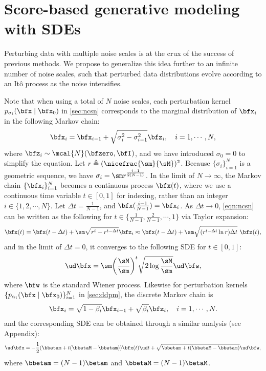 \section{Score-based generative modeling with SDEs}
Perturbing data with multiple noise scales is at the crux of the success of previous methods. We propose to generalize this idea further to an infinite number of noise scales, such that perturbed data distributions evolve according to an It\^{o} process as the noise intensifies. %

Note that when using a total of $N$ noise scales, each perturbation kernel $p_{\sigma_i}(\bfx \mid \bfx_0)$ in \cref{sec:ncsn} corresponds to the marginal distribution of $\bfx_i$ in the following Markov chain:
\begin{align}
\bfx_i = \bfx_{i-1} + \sqrt{\sigma_{i}^2 - \sigma_{i-1}^2} \bfz_i, \quad i=1,\cdots,N \label{eqn:ncsn},
\end{align}
where $\bfz_i \sim \mcal{N}(\bfzero, \bfI)$, and we have introduced $\sigma_0 = 0$ to simplify the equation. Let $r \triangleq (\nicefrac{\sm}{\sM})^2$. Because $\{\sigma_i\}_{i=1}^N$ is a geometric sequence, we have $\sigma_i = \sm r^{\frac{i-1}{2(N-1)}}$. In the limit of $N \to \infty$, the Markov chain $\{\bfx_i\}_{i=1}^N$ becomes a continuous process $\bfx(t)$, where we use a continuous time variable $t \in [0, 1]$ for indexing, rather than an integer $i \in \{1, 2, \cdots, N\}$. Let $\Delta t = \frac{1}{N-1}$, and $\bfx(\frac{i-1}{N-1}) = \bfx_i$. As $\Delta t \to 0$, \cref{eqn:ncsn} can be written as the following for $t \in \{\frac{1}{N-1}, \frac{2}{N-1}, \cdots, 1\}$ via Taylor expansion:
\begin{align*}
    \bfx(t) = \bfx(t-\Delta t) + \sm \sqrt{r^t - r^{t-\Delta t}}\bfz_i \approx \bfx(t-\Delta t) + \sm \sqrt{(r^{t-\Delta t}\ln r) \Delta t}~\bfz(t),
\end{align*}
and in the limit of $\Delta t = 0$, it converges to the following SDE for $t \in [0,1]$:
\begin{align}
\ud \bfx = \sm \bigg( \frac{\sM}{\sm} \bigg)^t \sqrt{2 \log \frac{\sM}{\sm}}\ud \bfw, \label{eqn:ncsn_sde}
\end{align}
where $\bfw$ is the standard Wiener process. Likewise for perturbation kernels $\{p_{\alpha_i}(\bfx \mid \bfx_0)\}_{i=1}^N$ in \cref{sec:ddpm}, the discrete Markov chain is
\begin{align}
    \bfx_i = \sqrt{1-\beta_{i}} \bfx_{i-1} + \sqrt{\beta_{i}} \bfz_i, \quad i=1,\cdots,N. \label{eqn:ddpm}
\end{align}
and the corresponding SDE can be obtained through a similar analysis (see Appendix):
\begin{align}
\ud \bfx = -\frac{1}{2}(\bbetam + t(\bbetaM - \bbetam)) \bfx(t) \ud t + \sqrt{\bbetam + t(\bbetaM - \bbetam)} \ud \bfw, \label{eqn:ddpm_sde}
\end{align}
where $\bbetam = (N-1) \betam$ and $\bbetaM = (N-1) \betaM$.

